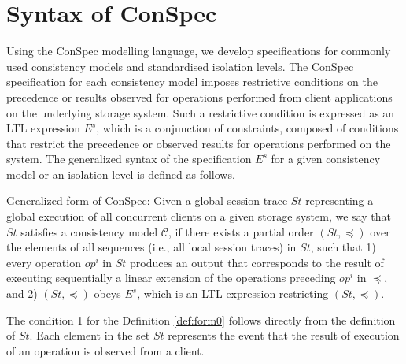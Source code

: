 \documentclass{sig-alternate-05-2015}
\begin{document}
 \section{Syntax of ConSpec}
  Using the ConSpec modelling language, we develop specifications for commonly used consistency models and standardised
  isolation levels.  The ConSpec specification for each consistency model imposes restrictive conditions on the precedence
  or  results observed for operations performed from client applications on the underlying storage system. Such a
  restrictive condition is expressed as an LTL expression $E^s$, which is
  a conjunction of constraints, composed of conditions that restrict the precedence or
  observed results for operations performed on the system. The generalized syntax of the specification $E^s$ for a given consistency model or an isolation
  level is defined as follows.
 \begin{definition}{Generalized form of ConSpec:}\label{def:form0}
Given a global session trace $\mathit{St}$ representing a global execution of all concurrent clients on a given storage
system, we say  that $\mathit{St}$ satisfies a consistency model $\mathcal{C}$,
if there exists a partial order
 $\left( \mathit{St}, \preccurlyeq \right)$ over the elements of all sequences (i.e., all local session traces)
  in $\mathit{St}$,
 such that 1) every operation $\mathit{op}^i$ in $\mathit{St}$ produces an output that corresponds to the result of executing sequentially a linear extension of the operations preceding $\mathit{op}^i$ in $\preccurlyeq$,
 and 2) $\left( \mathit{St}, \preccurlyeq \right)$ obeys $E^s$, which is an LTL expression restricting $\left( \mathit{St}, \preccurlyeq \right)$.
\end{definition}
  The condition 1 for the Definition \ref{def:form0} follows directly from the definition of $\mathit{St}$. Each element in
  the set $\mathit{St}$ represents the event that the result of execution of an operation is observed from a client.
\end{document}
